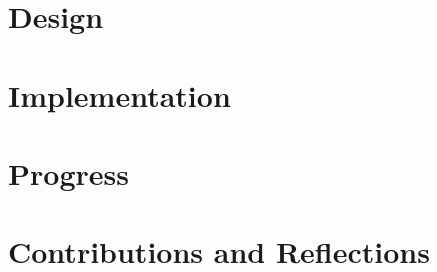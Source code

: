 \documentclass [12pt,letterpaper]{article}
\begin{document}
\section{Design}

\section{Implementation}

\section{Progress}

\section{Contributions and Reflections}


\pagebreak

 
\end{document}
